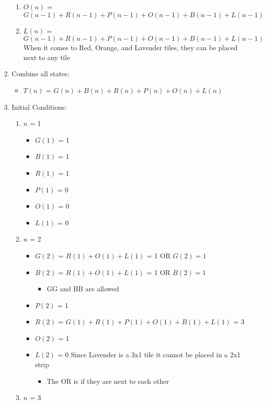 \documentclass[11pt]{article}
\newcounter{prnum}
\newenvironment{problem}{{\vskip 0.2in\noindent\bf Problem
       \addtocounter{prnum}{1} \arabic{prnum}.}}{\vskip 0.1in}
\begin{document}
\begin{problem}
\begin{enumerate}
\begin{enumerate}
      \item $O(n)$ = $G(n-1) + R(n-1) + P(n-1) + O(n-1) + B(n-1) + L(n-1)$
      \item $L(n)$ = $G(n-1) + R(n-1) + P(n-1) + O(n-1) + B(n-1) + L(n-1)$\\
        When it comes to Red, Orange, and Lavender tiles, they can be placed next to any tile
    \end{enumerate}
  \item Combine all states:
    \begin{itemize}
      \item $T(n)$ = $G(n) + B(n) + R(n) + P(n) + O(n) + L(n)$
    \end{itemize}
  \item Initial Conditions:
    \begin{enumerate}
      \item $n$ = 1
    \begin{itemize}
      \item $G(1)$ = 1
      \item $B(1)$ = 1
      \item $R(1)$ = 1
      \item $P(1)$ = 0
      \item $O(1)$ = 0
      \item $L(1)$ = 0
    \end{itemize}
  \item $n$ = 2 
    \begin{itemize}
      \item $G(2)$ = $R(1) + O(1) + L(1)$ = 1 OR $G(2) = 1$
      \item $B(2)$ = $R(1) + O(1) + L(1)$ = 1 OR $B(2) = 1$
        \begin{itemize}
          \item GG and BB are allowed
        \end{itemize}
      \item $P(2)$ = 1
      \item $R(2)$ = $G(1) + R(1) + P(1) + O(1) + B(1) + L(1)$ = 3
      \item $O(2)$ = 1
      \item $L(2)$ = 0 \Rightarrow\space Since Lavender is a 3x1 tile it cannot be placed in a 2x1 strip
        \begin{itemize}
          \item The OR is if they are next to each other
        \end{itemize}
        \end{itemize}
      \item $n$ = 3

\end{enumerate}
\end{enumerate}
\end{problem}
\end{document}
